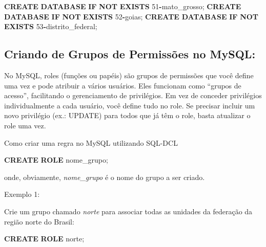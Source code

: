 \documentclass[
]{book}
\newenvironment{Shaded}{\begin{snugshade}}{\end{snugshade}}
\newcommand{\ControlFlowTok}[1]{\textcolor[rgb]{0.13,0.29,0.53}{\textbf{#1}}}
\newcommand{\DecValTok}[1]{\textcolor[rgb]{0.00,0.00,0.81}{#1}}
\newcommand{\KeywordTok}[1]{\textcolor[rgb]{0.13,0.29,0.53}{\textbf{#1}}}
\newcommand{\NormalTok}[1]{#1}
\newcommand{\OperatorTok}[1]{\textcolor[rgb]{0.81,0.36,0.00}{\textbf{#1}}}
\newcommand{\StringTok}[1]{\textcolor[rgb]{0.31,0.60,0.02}{#1}}
\begin{document}
\begin{Shaded}
\begin{Highlighting}[]
\KeywordTok{CREATE} \KeywordTok{DATABASE} \ControlFlowTok{IF} \KeywordTok{NOT} \KeywordTok{EXISTS}\NormalTok{ \textasciigrave{}}\DecValTok{51}\OperatorTok{{-}}\NormalTok{mato\_grosso\textasciigrave{};}
\KeywordTok{CREATE} \KeywordTok{DATABASE} \ControlFlowTok{IF} \KeywordTok{NOT} \KeywordTok{EXISTS}\NormalTok{ \textasciigrave{}}\DecValTok{52}\OperatorTok{{-}}\NormalTok{goias\textasciigrave{};}
\KeywordTok{CREATE} \KeywordTok{DATABASE} \ControlFlowTok{IF} \KeywordTok{NOT} \KeywordTok{EXISTS}\NormalTok{ \textasciigrave{}}\DecValTok{53}\OperatorTok{{-}}\NormalTok{distrito\_federal\textasciigrave{};}
\end{Highlighting}
\end{Shaded}

\subsection{Criando de Grupos de Permissões no MySQL:}\label{criando-de-grupos-de-permissuxf5es-no-mysql}

No MySQL, roles (funções ou papéis) são grupos de permissões que você define uma vez e pode atribuir a vários usuários. Eles funcionam como ``grupos de acesso'', facilitando o gerenciamento de privilégios. Em vez de conceder privilégios individualmente a cada usuário, você define tudo no role. Se precisar incluir um novo privilégio (ex.: UPDATE) para todos que já têm o role, basta atualizar o role uma vez.

Como criar uma regra no MySQL utilizando SQL-DCL

\begin{Shaded}
\begin{Highlighting}[]
\KeywordTok{CREATE} \KeywordTok{ROLE} \StringTok{\textquotesingle{}nome\_grupo\textquotesingle{}}\NormalTok{;}
\end{Highlighting}
\end{Shaded}

onde, obviamente, \emph{nome\_grupo} é o nome do grupo a ser criado.

Exemplo 1:

Crie um grupo chamado \emph{norte} para associar todas as unidades da federação da região norte do Brasil:

\begin{Shaded}
\begin{Highlighting}[]
\KeywordTok{CREATE} \KeywordTok{ROLE} \StringTok{\textquotesingle{}norte\textquotesingle{}}\NormalTok{;}
\end{Highlighting}
\end{Shaded}
\end{document}
